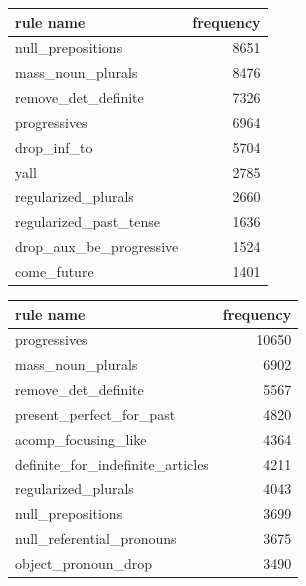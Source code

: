\documentclass[11pt]{article}
\begin{document}
\begin{center}
\begin{tabular}{lr}
\hline
\textbf{rule name}         & \textbf{frequency} \\ \hline
null\_prepositions         & 8651               \\
mass\_noun\_plurals        & 8476               \\
remove\_det\_definite      & 7326               \\
progressives               & 6964               \\
drop\_inf\_to              & 5704               \\
yall                       & 2785               \\
regularized\_plurals       & 2660               \\
regularized\_past\_tense   & 1636               \\
drop\_aux\_be\_progressive & 1524               \\
come\_future               & 1401               \\ \hline
\end{tabular}
\end{center}

\begin{center}
\begin{tabular}{lr}
\hline
\textbf{rule name}                  & \textbf{frequency} \\ \hline
progressives                        & 10650              \\
mass\_noun\_plurals                 & 6902               \\
remove\_det\_definite               & 5567               \\
present\_perfect\_for\_past         & 4820               \\
acomp\_focusing\_like               & 4364               \\
definite\_for\_indefinite\_articles & 4211               \\
regularized\_plurals                & 4043               \\
null\_prepositions                  & 3699               \\
null\_referential\_pronouns         & 3675               \\
object\_pronoun\_drop               & 3490               \\ \hline
\end{tabular}
\end{center}
\end{document}
